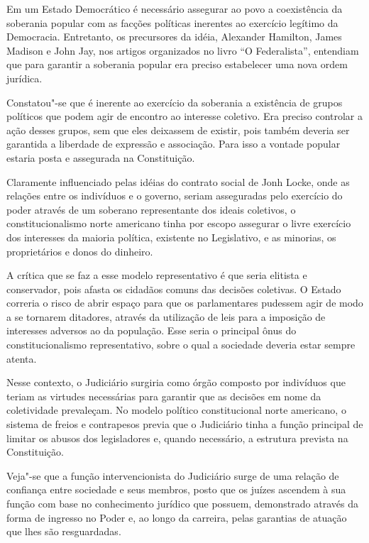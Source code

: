 Em um Estado Democrático é necessário assegurar ao povo a coexistência
da soberania popular com as facções políticas inerentes ao exercício
legítimo da Democracia. Entretanto, os precursores da idéia, Alexander
Hamilton, James Madison e John Jay, nos artigos organizados no livro ``O
Federalista'', entendiam que para garantir a soberania popular era
preciso estabelecer uma nova ordem jurídica.

Constatou"-se que é inerente ao exercício da soberania a existência de
grupos políticos que podem agir de encontro ao interesse coletivo. Era
preciso controlar a ação desses grupos, sem que eles deixassem de
existir, pois também deveria ser garantida a liberdade de expressão e
associação. Para isso a vontade popular estaria posta e assegurada na
Constituição.

Claramente influenciado pelas idéias do contrato social de Jonh Locke,
onde as relações entre os indivíduos e o governo, seriam asseguradas
pelo exercício do poder através de um soberano representante dos ideais
coletivos, o constitucionalismo norte americano tinha por escopo
assegurar o livre exercício dos interesses da maioria política,
existente no Legislativo, e as minorias, os proprietários e donos do
dinheiro.

A crítica que se faz a esse modelo representativo é que seria elitista e
conservador, pois afasta os cidadãos comuns das decisões coletivas. O
Estado correria o risco de abrir espaço para que os parlamentares
pudessem agir de modo a se tornarem ditadores, através da utilização de
leis para a imposição de interesses adversos ao da população. Esse seria
o principal ônus do constitucionalismo representativo, sobre o qual a
sociedade deveria estar sempre atenta.

Nesse contexto, o Judiciário surgiria como órgão composto por indivíduos
que teriam as virtudes necessárias para garantir que as decisões em nome
da coletividade prevaleçam. No modelo político constitucional norte
americano, o sistema de freios e contrapesos previa que o Judiciário
tinha a função principal de limitar os abusos dos legisladores e, quando
necessário, a estrutura prevista na Constituição.

Veja"-se que a função intervencionista do Judiciário surge de uma relação
de confiança entre sociedade e seus membros, posto que os juízes
ascendem à sua função com base no conhecimento jurídico que possuem,
demonstrado através da forma de ingresso no Poder e, ao longo da
carreira, pelas garantias de atuação que lhes são resguardadas.


